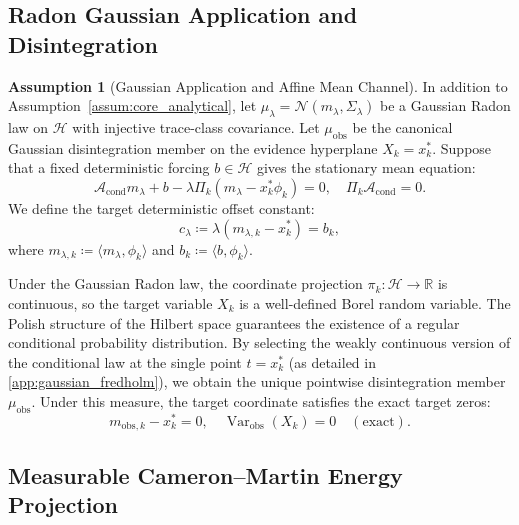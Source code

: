 \documentclass[preprint,12pt]{elsarticle}
\theoremstyle{plain}
\theoremstyle{definition}
\newtheorem{assumption}[theorem]{Assumption}
\theoremstyle{remark}
\newcommand{\cond}{\operatorname{cond}}
\newcommand{\Var}{\operatorname{Var}}
\begin{document}
    \subsection{Radon Gaussian Application and Disintegration}
    \label{sec:gaussian:setup}

    \begin{assumption}[Gaussian Application and Affine Mean Channel]
        \label{assum:gaussian_clamp}
        In addition to Assumption~\ref{assum:core_analytical}, let $\mu_\lambda = \mathcal{N}(m_\lambda, \Sigma_\lambda)$ be a Gaussian Radon law on $\mathcal{H}$ with injective trace-class covariance. Let $\mu_{\mathrm{obs}}$ be the canonical Gaussian disintegration member on the evidence hyperplane $X_k = x_k^*$. Suppose that a fixed deterministic forcing $b \in \mathcal{H}$ gives the stationary mean equation:
        \begin{equation}
            \mathcal{A}_{\cond} m_\lambda + b - \lambda \Pi_k (m_\lambda - x_k^* \phi_k) = 0, \quad \Pi_k \mathcal{A}_{\cond} = 0.
        \end{equation}
        We define the target deterministic offset constant:
        \begin{equation}
            c_\lambda \coloneqq \lambda(m_{\lambda,k} - x_k^*) = b_k,
        \end{equation}
        where $m_{\lambda,k} \coloneqq \langle m_\lambda, \phi_k \rangle$ and $b_k \coloneqq \langle b, \phi_k \rangle$.
    \end{assumption}

    Under the Gaussian Radon law, the coordinate projection $\pi_k: \mathcal{H} \to \mathbb{R}$ is continuous, so the target variable $X_k$ is a well-defined Borel random variable. The Polish structure of the Hilbert space guarantees the existence of a regular conditional probability distribution. 
    By selecting the weakly continuous version of the conditional law at the single point $t = x_k^*$ (as detailed in \ref{app:gaussian_fredholm}), we obtain the unique pointwise disintegration member $\mu_{\mathrm{obs}}$. Under this measure, the target coordinate satisfies the exact target zeros:
    \begin{equation}
        \label{eq:exact_target_zeros}
        m_{\text{obs},k} - x_k^* = 0, \quad \Var_{\text{obs}}(X_k) = 0 \quad (\text{exact}).
    \end{equation}

    \subsection{Measurable Cameron--Martin Energy Projection}
    \label{sec:gaussian:predictor}
\end{document}
